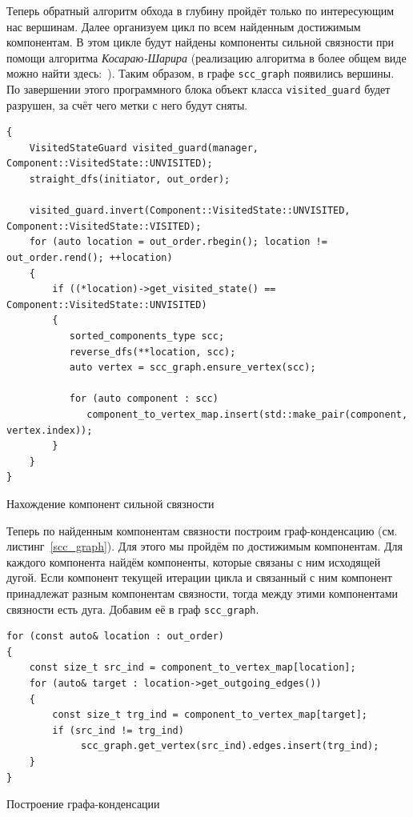 Теперь обратный алгоритм обхода в глубину пройдёт только по интересующим нас вершинам. Далее организуем цикл по всем найденным достижимым компонентам. В этом цикле будут найдены компоненты сильной связности при помощи алгоритма \textit{Косараю-Шарира} (реализацию алгоритма в более общем виде можно найти здесь:~\autocite{emax_topo}). Таким образом, в графе \lstinline!scc_graph! появились вершины. По завершении этого программного блока объект класса \lstinline!visited_guard! будет разрушен, за счёт чего метки с него будут сняты.


\begin{ListingEnv}
	\begin{lstlisting}
{
    VisitedStateGuard visited_guard(manager, Component::VisitedState::UNVISITED);
    straight_dfs(initiator, out_order);

    visited_guard.invert(Component::VisitedState::UNVISITED, Component::VisitedState::VISITED);
    for (auto location = out_order.rbegin(); location != out_order.rend(); ++location)
    {
        if ((*location)->get_visited_state() == Component::VisitedState::UNVISITED)
        {
           sorted_components_type scc;
           reverse_dfs(**location, scc);
           auto vertex = scc_graph.ensure_vertex(scc);
           
           for (auto component : scc)
              component_to_vertex_map.insert(std::make_pair(component, vertex.index));
        }
    }
}
	\end{lstlisting}
	\caption{Нахождение компонент сильной связности}\label{dfs_scc}
\end{ListingEnv}


Теперь по найденным компонентам связности построим граф-конденсацию (см. листинг~\ref{scc_graph}). Для этого мы пройдём по достижимым компонентам. Для каждого компонента найдём компоненты, которые связаны с ним исходящей дугой. Если компонент текущей итерации цикла и связанный с ним компонент принадлежат разным компонентам связности, тогда между этими компонентами связности есть дуга. Добавим её в граф \lstinline!scc_graph!.
\begin{ListingEnv}
	\begin{lstlisting}
for (const auto& location : out_order)
{
    const size_t src_ind = component_to_vertex_map[location];
    for (auto& target : location->get_outgoing_edges())
    {
        const size_t trg_ind = component_to_vertex_map[target];
        if (src_ind != trg_ind)
             scc_graph.get_vertex(src_ind).edges.insert(trg_ind);
    }
}
	\end{lstlisting}
	\caption{Построение графа-конденсации}\label{scc_graph}
\end{ListingEnv}

